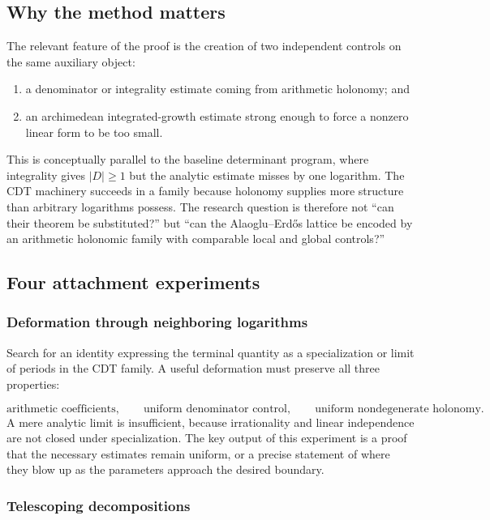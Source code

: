 \documentclass[10pt,letterpaper]{article}
\begin{document}
\subsection{Why the method matters}

The relevant feature of the proof is the creation of two independent controls on the same
auxiliary object:

\begin{enumerate}
\item a denominator or integrality estimate coming from arithmetic holonomy; and
\item an archimedean integrated-growth estimate strong enough to force a nonzero linear form
to be too small.
\end{enumerate}

This is conceptually parallel to the baseline determinant program, where integrality gives
\(|D|\geq1\) but the analytic estimate misses by one logarithm.  The CDT machinery succeeds
in a family because holonomy supplies more structure than arbitrary logarithms possess.  The
research question is therefore not ``can their theorem be substituted?'' but ``can the
Alaoglu--Erd\H{o}s lattice be encoded by an arithmetic holonomic family with comparable
local and global controls?''

\subsection{Four attachment experiments}

\subsubsection{Deformation through neighboring logarithms}

Search for an identity expressing the terminal quantity as a specialization or limit of
periods in the CDT family.  A useful deformation must preserve all three properties:

\[
  \text{arithmetic coefficients},\qquad
  \text{uniform denominator control},\qquad
  \text{uniform nondegenerate holonomy}.
\]
A mere analytic limit is insufficient, because irrationality and linear independence are not
closed under specialization.  The key output of this experiment is a proof that the
necessary estimates remain uniform, or a precise statement of where they blow up as the
parameters approach the desired boundary.

\subsubsection{Telescoping decompositions}
\end{document}
